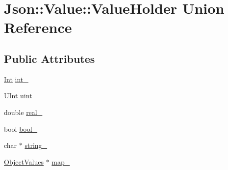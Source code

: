 \hypertarget{unionJson_1_1Value_1_1ValueHolder}{\section{Json\-:\-:Value\-:\-:Value\-Holder Union Reference}
\label{d9/d18/unionJson_1_1Value_1_1ValueHolder}
}
\subsection*{Public Attributes}
\begin{DoxyCompactItemize}
\item 
\hyperlink{classJson_1_1Value_abdf7a7ff73eb130ffcab28504ffdb405}{Int} \hyperlink{unionJson_1_1Value_1_1ValueHolder_abdb14833bc3a9e9fc13dd3a4c4f85e31}{int\-\_\-}
\item 
\hyperlink{classJson_1_1Value_a0933d59b45793ae4aade1757c322a98d}{U\-Int} \hyperlink{unionJson_1_1Value_1_1ValueHolder_aac6f758fec8757ef1908fa7c329244a7}{uint\-\_\-}
\item 
double \hyperlink{unionJson_1_1Value_1_1ValueHolder_af0c5ca724e5fe3a15db773d750e2351e}{real\-\_\-}
\item 
bool \hyperlink{unionJson_1_1Value_1_1ValueHolder_a92edab1861dadbfefd8be5fd4285eefe}{bool\-\_\-}
\item 
char $\ast$ \hyperlink{unionJson_1_1Value_1_1ValueHolder_afedf5861e3368a0a9587e499f1ac23b9}{string\-\_\-}
\item 
\hyperlink{classJson_1_1Value_a08b6c80c3af7071d908dabf044de5388}{Object\-Values} $\ast$ \hyperlink{unionJson_1_1Value_1_1ValueHolder_a37a6355da01e4dec1fabba8c1520f297}{map\-\_\-}
\end{DoxyCompactItemize}


